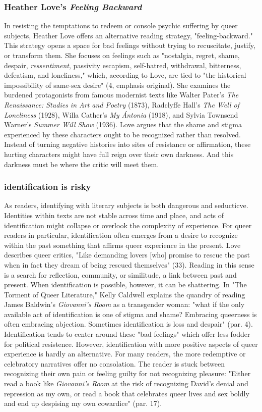 \documentclass[11pt]{article}
\begin{document}
\subsubsection{Heather Love's \emph{Feeling Backward}}
\label{sec:org9a0116e}
In resisting the temptations to redeem or console psychic suffering by
queer subjects, Heather Love offers an alternative reading strategy,
"feeling-backward." This strategy opens a space for bad feelings
without trying to recuscitate, justify, or transform them. She focuses
on feelings such as "nostalgia, regret, shame, despair,
\emph{ressentiment}, passivity escapism, self-hatred, withdrawal,
bitterness, defeatism, and loneliness," which, according to Love, are
tied to "the historical impossibility of same-sex desire" (4, emphasis
original). She examines the burdened protagonists from famous
modernist texts like Walter Pater's \emph{The Renaissance: Studies in Art
and Poetry} (1873), Radclyffe Hall's \emph{The Well of Loneliness} (1928),
Willa Cather's \emph{My Ántonia} (1918), and Sylvia Townsend Warner's
\emph{Summer Will Show} (1936). Love argues that the shame and stigma
experienced by these characters ought to be recognized rather than
resolved. Instead of turning negative histories into sites of
resistance or affirmation, these hurting characters might have full
reign over their own darkness. And this darkness must be where the
critic will meet them.

\subsubsection{identification is risky}
\label{sec:orgf7b4887}
As readers, identifying with literary subjects is both dangerous and
seducticve. Identities within texts are not stable across time and
place, and acts of identification might collapse or overlook the
complexity of experience. For queer readers in particular,
identification often emerges from a desire to recognize within the
past something that affirms queer experience in the present. Love
describes queer critics, "Like demanding lovers [who] promise to
rescue the past when in fact they dream of being rescued themselves"
(33). Reading in this sense is a search for reflection, community, or
similitude, a link between past and present. When identification is
possible, however, it can be shattering. In "The Torment of Queer
Literature," Kelly Caldwell explains the quandry of reading James
Baldwin's \emph{Giovanni's Room} as a transgender woman: "what if the only
available act of identification is one of stigma and shame? Embracing
queerness is often embracing abjection. Sometimes identification is
loss and despair" (par. 4). Identification tends to center around
these "bad feelings" which offer less fodder for political
resistence. However, identification with more positive aspects of
queer experience is hardly an alternative. For many readers, the more
redemptive or celebratory narratives offer no consolation. The reader
is stuck between recognizing their own pain or feeling guilty for not
recognizing pleasure: "Either read a book like \emph{Giovanni’s Room} at
the risk of recognizing David’s denial and repression as my own, or
read a book that celebrates queer lives and sex boldly and end up
despising my own cowardice" (par. 17).
\end{document}
